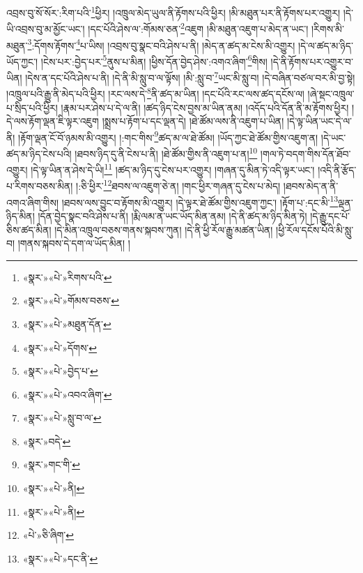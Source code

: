 འབྲས་བུ་སོ་སོར་:རིག་པའི་\footnote{«སྣར་»«པེ་»རིགས་པའི་}ཕྱིར། །འཁྲུལ་མེད་ཡུལ་ནི་རྟོགས་པའི་ཕྱིར། །མི་མཐུན་པར་ནི་རྟོགས་པར་འགྱུར། །དེ་ཡི་འབྲས་བུ་མ་མྱོང་ཡང་། །དང་པོའི་ཤེས་ལ་:གོམས་ཅན་\footnote{«སྣར་»«པེ་»གོམས་བཅས་}འཇུག །མི་མཐུན་འཇུག་པ་མེད་ན་ཡང་། །རིགས་མི་མཐུན་\footnote{«སྣར་»«པེ་»མཐུན་དོན་}:དོགས་རྟོགས་\footnote{«སྣར་»«པེ་»དོགས་}པ་ཡིས། །འབྲས་བུ་སྣང་བའི་ཤེས་པ་ནི། །མེད་ན་ཚད་མ་ངེས་མི་འགྱུར། །དེ་ལ་ཚད་མ་ཉིད་ཡོད་ཀྱང་། །ངེས་པར་:བྱེད་པར་\footnote{«སྣར་»«པེ་»བྱེད་པ་}ནུས་པ་མིན། །ཕྱིས་དོན་བྱེད་ཤེས་:འགའ་ཞིག་\footnote{«སྣར་»«པེ་»འབའ་ཞིག་}གིས། །དེ་ནི་རྟོགས་པར་འགྱུར་བ་ཡིན། །དེས་ན་དང་པོའི་ཤེས་པ་ནི། །དེ་ནི་མི་སླུ་བ་ལ་ལྟོས། །མི་:སླུ་བ་\footnote{«སྣར་»«པེ་»སླུ་བ་ལ་}ཡང་མི་སླུ་བ། །དེ་བཞིན་བཙལ་བར་མི་བྱ་སྟེ། །འཁྲུལ་པའི་རྒྱུ་ནི་མེད་པའི་ཕྱིར། །རང་ལས་དེ་\footnote{«སྣར་»བདེ་}ནི་ཚད་མ་ཡིན། །དང་པོའི་རང་ལས་ཚད་དངོས་ལ། །ཞེ་སྡང་འཁྲུལ་པ་སྲིད་པའི་ཕྱིར། །རྣམ་པར་ཤེས་པ་དེ་ལ་ནི། །ཚད་ཉིད་ངེས་བྱས་མ་ཡིན་ནམ། །འདོད་པའི་དོན་ནི་མ་རྟོགས་ཕྱིར། །དེ་ལས་རྟོག་ལྡན་ཇི་ལྟར་འཇུག །སྨྲས་པ་རྟོག་པ་དང་ལྡན་དེ། །ཐེ་ཚོམ་ལས་ནི་འཇུག་པ་ཡིན། །དེ་ལྟ་ཡིན་ཡང་དེ་ལ་ནི། །རྟོག་ལྡན་ངོ་བོ་ཉམས་མི་འགྱུར། །:གང་གིས་\footnote{«སྣར་»གང་གི་}ཚད་མ་ལ་ཐེ་ཚོམ། །ཡོད་ཀྱང་ཐེ་ཚོམ་གྱིས་འཇུག་ན། །དེ་ཡང་ཚད་མ་ཉིད་ངེས་པའི། །ཐབས་ཉིད་དུ་ནི་ངེས་པ་ནི། །ཐེ་ཚོམ་གྱིས་ནི་འཇུག་པ་ན།\footnote{«སྣར་»«པེ་»ནི།} །གལ་ཏེ་བདག་གིས་དོན་ཐོབ་འགྱུར། །དེ་ལྟ་ཡིན་ན་ཤེས་དེ་ཡི།\footnote{«སྣར་»«པེ་»ནི།} །ཚད་མ་ཉིད་དུ་ངེས་པར་འགྱུར། །གཞན་དུ་མིན་ཏེ་འདི་ལྟར་ཡང་། །འདི་ནི་རྩོད་པ་རིགས་བཅས་མིན། །:ཅི་ཕྱིར་\footnote{«པེ་»ཅི་ཞིག་}ཐབས་ལ་འཇུག་ཅེ་ན། །གང་ཕྱིར་གཞན་དུ་ངེས་པ་མེད། །ཐབས་མེད་ན་ནི་འགའ་ཞིག་གིས། །ཐབས་ལས་བྱུང་བ་རྟོགས་མི་འགྱུར། །དེ་ལྟར་ཐེ་ཚོམ་གྱིས་འཇུག་ཀྱང་། །རྟོག་པ་:དང་མི་\footnote{«སྣར་»«པེ་»དང་ནི་}ལྡན་ཉིད་མིན། །དོན་བྱེད་སྣང་བའི་ཤེས་པ་ནི། །རྨི་ལམ་ན་ཡང་ཡོད་མིན་ནམ། །དེ་ནི་ཚད་མ་ཉིད་མིན་ཏེ། །དེ་རྒྱུ་དང་པོ་ཅིས་ཚད་མིན། །དེ་མིན་འཁྲུལ་བཅས་གནས་སྐབས་ཀུན། །དེ་ནི་ཕྱི་རོལ་རྒྱུ་མཚན་ཡིན། །ཕྱི་རོལ་དངོས་པོའི་མི་སླུ་བ། །གནས་སྐབས་དེ་དག་ལ་ཡོད་མིན། །
